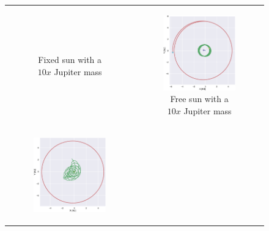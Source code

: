 \documentclass[aps,reprint]{revtex4-1}
\begin{document}
\begin{figure}
\begin{tabular}{cc}
\begin{subfigure}[b]{0.5\columnwidth}
        \caption{Fixed sun with a \(10x\) Jupiter mass}
        \label{fix10}
    \end{subfigure}&
    \begin{subfigure}[b]{0.5\columnwidth}
        \includegraphics[width=\columnwidth]{figures/jupiter2_10.eps}
        \caption{Free sun with a \(10x\) Jupiter mass}
        \label{free10}
    \end{subfigure}\\
    \begin{subfigure}[b]{0.5\columnwidth}
        \includegraphics[width=\columnwidth]{figures/jupiter_100.eps}

\end{subfigure}
\end{tabular}
\end{figure}
\end{document}
